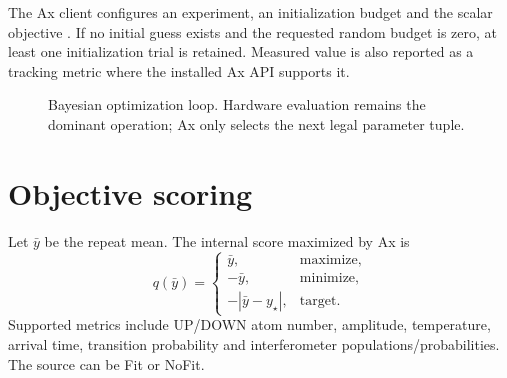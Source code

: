 \documentclass[11pt,oneside,openany]{book}
\newcommand{\code}[1]{\texttt{\detokenize{#1}}}
\begin{document}
The Ax client configures an experiment, an initialization budget and the scalar objective
\code{optimization_score}. If no initial guess exists and the requested random budget is
zero, at least one initialization trial is retained. Measured value is also reported as a
tracking metric where the installed Ax API supports it.

\begin{figure}[htbp]
\centering
{}
\caption{Bayesian optimization loop. Hardware evaluation remains the dominant operation;
Ax only selects the next legal parameter tuple.}
\label{fig:bayes-loop}
\end{figure}

\section{Objective scoring}
Let $\bar y$ be the repeat mean. The internal score maximized by Ax is
\begin{equation}
  q(\bar y)=
  \begin{cases}
    \bar y, & \text{maximize},\\
    -\bar y, & \text{minimize},\\
    -|\bar y-y_\star|, & \text{target}.
  \end{cases}
\end{equation}
Supported metrics include UP/DOWN atom number, amplitude, temperature, arrival time,
transition probability and interferometer populations/probabilities. The source can be Fit
or NoFit.
\end{document}
